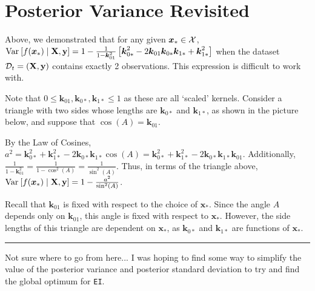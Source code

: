 \documentclass[11pt]{article}
\numberwithin{figure}{section}
\numberwithin{equation}{section}
\def\EI{\texttt{EI}}
\newcommand{\bs}[1]{\boldsymbol{#1}}
\def\bsx{\bs{x}}
\def\bsk{\bs{k}}
\def\xast{\bsx_{*}}
\begin{document}
\newpage

\section{Posterior Variance Revisited}
Above, we demonstrated that for any given $\xast \in \calX$, $\var{f(\xast) \mid \mathbf{X}, \mathbf{y}} = 1 - \frac{1}{1 - \bsk_{01}^{2}}\left[\bsk_{0*}^{2} - 2\bsk_{01}\bsk_{0*}\bsk_{1*} + \bsk_{1*}^{2}\right]$ when the dataset $\mathcal{D}_{t} = (\mathbf{X}, \mathbf{y})$ contains exactly 2 observations. This expression is difficult to work with.

Note that $0 \le \bsk_{01}, \bsk_{0*}, \bsk_{1*} \le 1$ as these are all `scaled' kernels. Consider a triangle with two sides whose lengths are $\bsk_{0*}$ and $\bsk_{1*}$, as shown in the picture below, and suppose that $\cos(A) = \bsk_{01}$.

\vspace*{1.0cm}
\begin{center}
\end{center}

By the Law of Cosines, $a^2 = \bsk_{0*}^2 + \bsk_{1*}^{2} - 2\bsk_{0*}\bsk_{1*}\cos(A) = \bsk_{0*}^2 + \bsk_{1*}^{2} - 2\bsk_{0*}\bsk_{1*}\bsk_{01}$. Additionally, $\frac{1}{1 - \bsk_{01}^{2}} = \frac{1}{1 - \cos^{2}(A)} = \frac{1}{\sin^{2}(A)}$. Thus, in terms of the triangle above, $\var{f(\xast) \mid \mathbf{X}, \mathbf{y}} = 1 - \frac{a^2}{\sin^2(A)}$.

Recall that $\bsk_{01}$ is fixed with respect to the choice of $\xast$. Since the angle $A$ depends only on $\bsk_{01}$, this angle is fixed with respect to $\xast$. However, the side lengths of this triangle are dependent on $\xast$, as $\bsk_{0*}$ and $\bsk_{1*}$ are functions of $\xast$. 

\noindent\rule{\textwidth}{0.8pt}

Not sure where to go from here... I was hoping to find some way to simplify the value of the posterior variance and posterior standard deviation to try and find the global optimum for \EI.
\end{document}
